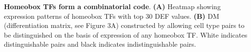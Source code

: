 \textbf{Homeobox TFs form a combinatorial code}.  
\textbf{(A)} Heatmap showing expression patterns of homeobox TFs with top 30 DEF values. \textbf{(B)} DM (differentiation matrix, see Figure 3A) constructed by allowing cell type pairs to be distinguished on the basis of expression of any homeobox TF. White indicates distinguishable pairs and black indicates indistinguishable pairs. 